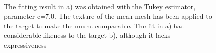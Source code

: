 \begin{figure}[h!]
\centering
{}\\
\label{fig:fitcomparison}
\caption{The fitting result in a) was obtained with the Tukey estimator, parameter c=7.0. The texture of the mean mesh has been applied to the target to make the meshs comparable. The fit in a) has considerable likeness to the target b), although it lacks expressiveness}
\end{figure}

